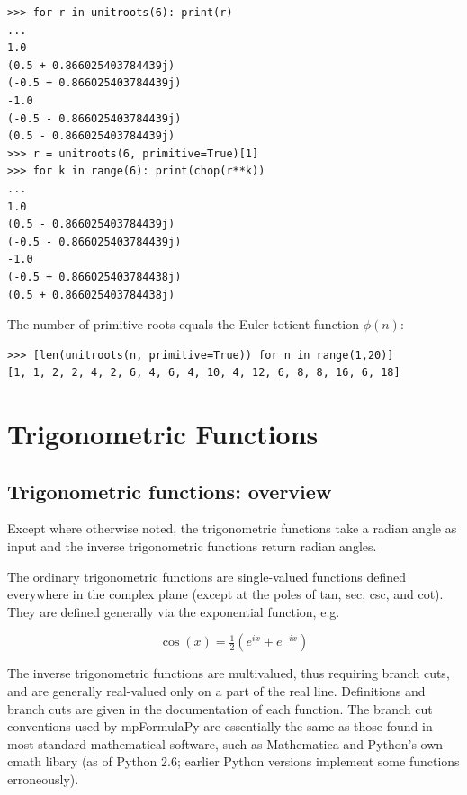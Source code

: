\begin{lstlisting}
>>> for r in unitroots(6): print(r)
...
1.0
(0.5 + 0.866025403784439j)
(-0.5 + 0.866025403784439j)
-1.0
(-0.5 - 0.866025403784439j)
(0.5 - 0.866025403784439j)
>>> r = unitroots(6, primitive=True)[1]
>>> for k in range(6): print(chop(r**k))
...
1.0
(0.5 - 0.866025403784439j)
(-0.5 - 0.866025403784439j)
-1.0
(-0.5 + 0.866025403784438j)
(0.5 + 0.866025403784438j)
\end{lstlisting}



The number of primitive roots equals the Euler totient function $\phi(n)$:
\begin{lstlisting}
>>> [len(unitroots(n, primitive=True)) for n in range(1,20)]
[1, 1, 2, 2, 4, 2, 6, 4, 6, 4, 10, 4, 12, 6, 8, 8, 16, 6, 18]
\end{lstlisting}







\newpage
\section{Trigonometric Functions}
\label{TrigonometricFunctionsCplx}

\subsection{Trigonometric functions: overview}
Except where otherwise noted, the trigonometric functions take a radian angle as input and the inverse trigonometric functions return radian angles.

\vpara
The ordinary trigonometric functions are single-valued functions defined everywhere in the complex plane (except at the poles of tan, sec, csc, and cot). They are defined generally via the exponential function, e.g.

\begin{equation}
	\cos(x)=\tfrac{1}{2}(e^{ix} + e^{-ix})
\end{equation}

The inverse trigonometric functions are multivalued, thus requiring branch cuts, and are generally real-valued only on a part of the real line. Definitions and branch cuts are given in the documentation of each function. The branch cut conventions used by mpFormulaPy are essentially the same as those found in most standard mathematical software, such as
Mathematica and Python’s own cmath libary (as of Python 2.6; earlier Python versions implement some functions erroneously).





